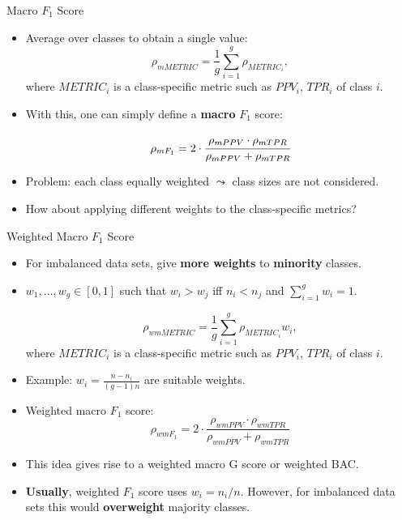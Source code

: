 \documentclass[11pt,compress,t,notes=noshow, xcolor=table]{beamer}
\begin{document}
\begin{vbframe}{Macro $F_1$ Score}
	
	\small{

    	\begin{itemize}
    
    		\item Average over classes to obtain a single value:
            $$\rho_{mMETRIC} = \frac{1}{g}\sum_{i=1}^g \rho_{METRIC_i},$$
            where $METRIC_i$ is a class-specific metric such as $PPV_i$, $TPR_i$ of class $i$.
    		
    	
    		\item With this, one can simply define a \textbf{macro} $F_1$ score:
    	
    		$$\rho_{mF_1} = 2 \cdot \cfrac{\rho_{mPPV} \cdot \rho_{mTPR}}{\rho_{mPPV} + 
    			\rho_{mTPR}}$$
    
    		\item Problem: each class equally weighted $\leadsto$ class sizes are not considered.
    
            \item How about applying different weights to the class-specific metrics?

    	\end{itemize}
	}
\end{vbframe}

\begin{vbframe}{Weighted Macro $F_1$ Score}

	\small{

    	\begin{itemize}
    
    		\item For imbalanced data sets, give \textbf{more weights} to \textbf{minority} classes.
      
            \item $w_1,\ldots,w_g \in[0,1]$  such that $w_i > w_j$ iff $n_i < n_j$ and $\sum_{i=1}^g w_i = 1.$
    
            $$\rho_{wmMETRIC} = \frac{1}{g}\sum_{i=1}^g \rho_{METRIC_i} w_i,$$
            where $METRIC_i$ is a class-specific metric such as $PPV_i$, $TPR_i$ of class $i$.
    	 
    		\item Example: $w_i = \frac{n - n_i}{(g-1)n}$ are suitable weights.
    
    		\item Weighted macro $F_1$ score:	
    		$$\rho_{wmF_1} = 2 \cdot \frac{\rho_{wmPPV} \cdot \rho_{wmTPR}}{\rho_{wmPPV} + \rho_{wmTPR}}$$
      
    		\item This idea gives rise to a weighted macro G score or weighted BAC.
    	
    		\item \textbf{Usually}, weighted $F_1$ score uses $w_i = n_i/n$. However, for imbalanced data sets this would \textbf{overweight} majority classes.
    
    	\end{itemize}
	}
\end{vbframe}
\end{document}
